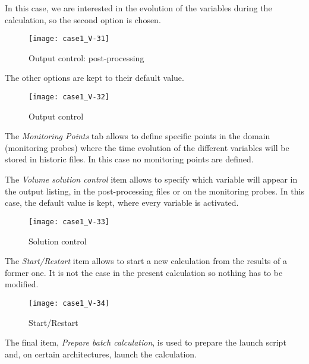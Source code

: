 In this case, we are interested in the evolution of the variables during the
calculation, so the second option is chosen.

\begin{figure}[ht]
\begin{center}
\texttt{[image: case1\_V-31]}
\caption{Output control: post-processing}
\label{fig34_e1}
\end{center}
\end{figure}


\clearpage
The other options are kept to their default value.

\begin{figure}[ht]
\begin{center}
\texttt{[image: case1\_V-32]}
\caption{Output control}
\label{fig35_e1}
\end{center}
\end{figure}

The {\itshape Monitoring Points} tab allows to define specific points
in the domain (monitoring probes) where the time evolution of the different
variables will be stored in historic files. In this case no monitoring points
are defined.


\clearpage
The {\itshape Volume solution control} item allows to specify which variable will
appear in the output listing, in the post-processing files or on the
monitoring probes. In this case, the default value is kept, where every variable
is activated.


\begin{figure}[ht]
\begin{center}
\texttt{[image: case1\_V-33]}
\caption{Solution control}
\label{fig36_e1}
\end{center}
\end{figure}


\clearpage
The {\itshape Start/Restart} item allows to start a new calculation from the
results of a former one. It is not the case in the present calculation so
nothing has to be modified.

\begin{figure}[ht]
\begin{center}
\texttt{[image: case1\_V-34]}
\caption{Start/Restart}
\label{fig40_e1}
\end{center}
\end{figure}


\clearpage
The final item, {\itshape Prepare batch calculation}, is used to prepare the launch
script and, on certain architectures, launch the calculation.

